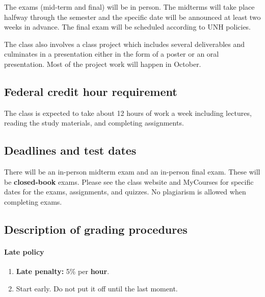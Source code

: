 \documentclass[11pt]{article}
\begin{document}
The exams (mid-term and final) will be in person.
The midterms will take place halfway through the semester and the specific date will be announced at least two weeks in advance.
The final exam will be scheduled according to UNH policies.

The class also involves a class project which includes several deliverables and culminates in a presentation either in
the form of a poster or an oral presentation. Most of the project work will happen in October.

\subsection{Federal credit hour requirement}

The class is expected to take about 12 hours of work a week including lectures, reading the study materials, and completing assignments.

\subsection{Deadlines and test dates}

There will be an in-person midterm exam and an in-person final exam. These will be \textbf{closed-book} exams.
Please see the class website and MyCourses for specific dates for the exams, assignments, and quizzes.
No plagiarism is allowed when completing exams.

\subsection{Description of grading procedures}

\paragraph{Late policy}
\begin{enumerate}[nosep]
\item \textbf{Late penalty:} 5\% per \textbf{hour}.
\item Start early. Do not put it off until the last moment.
\end{enumerate}
\end{document}
